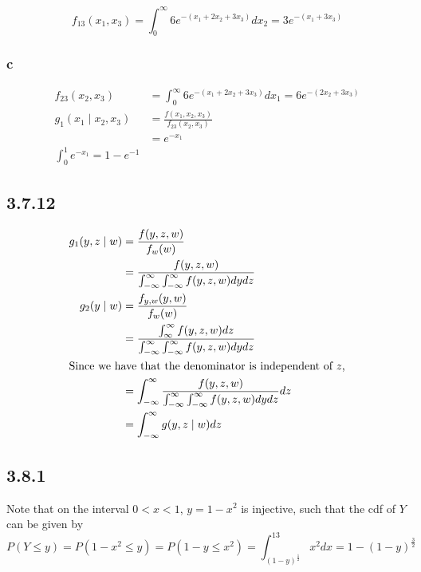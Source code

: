 \documentclass[12pt,letterpaper]{article}
\theoremstyle{definition}
\begin{document}
\[
  f_{13}(x_1, x_3) = \int_0^\infty6e^{-(x_1 + 2x_2 + 3x_3)}dx_2 =
  3e^{-(x_1 + 3x_3)}
\]

\subsubsection*{c}

\begin{align*}
  f_{23}(x_2, x_3) &= \int_0^\infty6e^{-(x_1 + 2x_2 + 3x_3)}dx_1 = 6e^{-(2x_2 + 3x_3)} \\
  g_1(x_1 \mid x_2, x_3) &= \frac{f(x_1, x_2, x_3)}{f_{23}(x_2, x_3)} \\
                   &= e^{-x_1} \\
  \int_0^1e^{-x_1} = 1 - e^{-1}
\end{align*}

\subsection*{3.7.12}

\begin{align*}
  g_1(y, z \mid w) &= \frac{f(y, z, w)}{f_w(w)} \\
                   &= \frac{f(y,z,w)}{\int_{-\infty}^\infty \int_{-\infty}^\infty f(y, z, w)dydz} \\
  g_2(y \mid w) &= \frac{f_{y,w}(y, w)}{f_{w}(w)} \\
                   &=\frac{\int_{\infty}^\infty f(y,z,w)dz}{\int_{-\infty}^\infty\int_{-\infty}^\infty f(y, z, w)dydz} \\
                   \intertext{Since we have that the denominator is independent of $z$,}
                   &= \int_{-\infty}^\infty\frac{f(y,z,w)}{\int_{-\infty}^\infty \int_{-\infty}^\infty f(y, z, w)dydz}dz \\
                   &= \int_{-\infty}^\infty g(y, z \mid w)dz \\
\end{align*}

\subsection*{3.8.1}

Note that on the interval $0 < x < 1$, $y = 1 - x^2$ is injective, such that the
cdf of $Y$ can be given by
\[
  P(Y \leq y) = P(1-x^2 \leq y) = P(1-y \leq x^2) =
  \int_{(1-y)^{\frac{1}{2}}}^13x^2dx = 1 - (1-y)^{\frac{3}{2}}
\]
\end{document}
